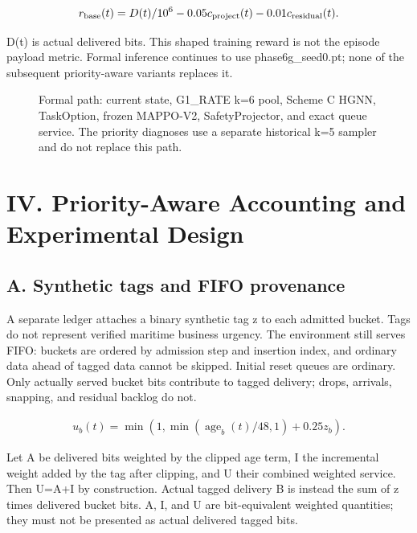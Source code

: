 \begin{equation*}
\begin{gathered}
r_{\rm base}(t)=D(t)/10^6-0.05c_{\rm project}(t)-0.01c_{\rm residual}(t).
\end{gathered}
\end{equation*}

D(t) is actual delivered bits. This shaped training reward is not the episode payload metric. Formal inference continues to use phase6g\_seed0.pt; none of the subsequent priority-aware variants replaces it.

\begin{figure}[tbp]
\centering

\caption{Formal path: current state, G1\_RATE k=6 pool, Scheme C HGNN, TaskOption, frozen MAPPO-V2, SafetyProjector, and exact queue service. The priority diagnoses use a separate historical k=5 sampler and do not replace this path.}
\label{fig:formal-architecture}
\end{figure}

\section*{IV. Priority-Aware Accounting and Experimental Design}

\subsection*{A. Synthetic tags and FIFO provenance}

A separate ledger attaches a binary synthetic tag z to each admitted bucket. Tags do not represent verified maritime business urgency. The environment still serves FIFO: buckets are ordered by admission step and insertion index, and ordinary data ahead of tagged data cannot be skipped. Initial reset queues are ordinary. Only actually served bucket bits contribute to tagged delivery; drops, arrivals, snapping, and residual backlog do not.

\begin{equation*}
\begin{gathered}
u_b(t)=\min\!\left(1,\min(\operatorname{age}_b(t)/48,1)+0.25z_b\right).
\end{gathered}
\end{equation*}

Let A be delivered bits weighted by the clipped age term, I the incremental weight added by the tag after clipping, and U their combined weighted service. Then U=A+I by construction. Actual tagged delivery B is instead the sum of z times delivered bucket bits. A, I, and U are bit-equivalent weighted quantities; they must not be presented as actual delivered tagged bits.

